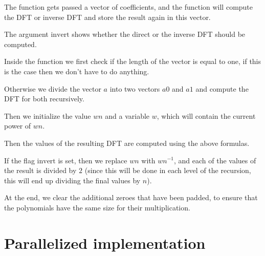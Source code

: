 \documentclass[12pt]{article}
\theoremstyle{definition}
\begin{document}
The function gets passed a vector of coefficients, and the function will compute the DFT or inverse DFT and store the result again in this vector.

The argument $\text{invert}$ shows whether the direct or the inverse DFT should be computed.

Inside the function we first check if the length of the vector is equal to one, if this is the case then we don't have to do anything.

Otherwise we divide the vector $a$ into two vectors $a0$ and $a1$ and compute the DFT for both recursively.

Then we initialize the value $wn$ and a variable $w$, which will contain the current power of $wn$.

Then the values of the resulting DFT are computed using the above formulas.

If the flag $\text{invert}$ is set, then we replace $wn$ with $wn^{-1}$, and each of the values of the result is divided by $2$ (since this will be done in each level of the recursion, this will end up dividing the final values by $n$).

At the end, we clear the additional zeroes that have been padded, to ensure that the polynomials have the same size for their multiplication.

\section{Parallelized implementation}
\end{document}
